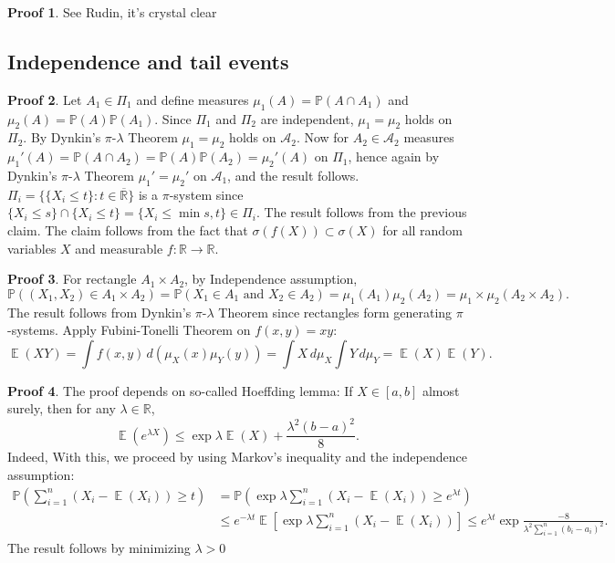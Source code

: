 \documentclass[hidelinks,11pt]{article}
\theoremstyle{definition}
\theoremstyle{dotless}
\newtheorem{prop}{Proof}[section]
\theoremstyle{remark}
\DeclareMathOperator{\E}{\mathbb{E}}
\DeclareMathOperator{\1}{\mathbf{1}}
\begin{document}
\begin{prop}
See Rudin, it's crystal clear
\end{prop}

\subsection{Independence and tail events}

\begin{prop}
Let $A_1\in\Pi_1$ and define measures $\mu_1(A)=\mathbb{P}(A\cap A_1)$ and $\mu_2(A)=\mathbb{P}(A)\mathbb{P}(A_1)$. Since $\Pi_1$ and $\Pi_2$ are independent, $\mu_1=\mu_2$ holds on $\Pi_2$. By Dynkin's $\pi$-$\lambda$ Theorem $\mu_1=\mu_2$ holds on $\mathcal{A}_2$. Now for $A_2\in\mathcal{A}_2$ measures $\mu_1'(A)=\mathbb{P}(A\cap A_2)=\mathbb{P}(A)\mathbb{P}(A_2)=\mu_2'(A)$ on $\Pi_1$, hence again by Dynkin's $\pi$-$\lambda$ Theorem $\mu_1'=\mu_2'$ on $\mathcal{A}_1$, and the result follows.\medbreak
$\Pi_i=\{\{X_i\leq t\}:t\in\overline{\mathbb{R}}\}$ is a $\pi$-system since $\{X_i\leq s\}\cap\{X_i\leq t\}=\{X_i\leq\min{s,t}\}\in\Pi_i$. The result follows from the previous claim.\medbreak
The claim follows from the fact that $\sigma(f(X))\subset\sigma(X)$ for all random variables $X$ and measurable $f:\mathbb{R}\to\mathbb{R}$.
\end{prop}

\begin{prop}
For rectangle $A_1\times A_2$, by Independence assumption,
\[\mathbb{P}((X_1,X_2)\in A_1\times A_2)=\mathbb{P}(X_1\in A_1\textrm{ and }X_2\in A_2)=\mu_1(A_1)\mu_2(A_2)=\mu_1\times\mu_2(A_2\times A_2).\]
The result follows from Dynkin's $\pi$-$\lambda$ Theorem since rectangles form generating $\pi$-systems.\medbreak
Apply Fubini-Tonelli Theorem on $f(x,y)=xy$:
\[\E(XY)=\int f(x,y)\,d(\mu_X(x)\mu_Y(y))=\int X\,d\mu_X\int Y\,d\mu_Y=\E(X)\E(Y).\]
\end{prop}

\begin{prop}
The proof depends on so-called Hoeffding lemma: If $X\in[a,b]$ almost surely, then for any $\lambda\in\mathbb{R}$,
\[\E(e^{\lambda X})\leq\exp{\lambda\E(X)+\frac{\lambda^2(b-a)^2}{8}}.\]
Indeed,\medbreak
With this, we proceed by using Markov's inequality and the independence assumption:
\begin{align*}
    \mathbb{P}\left(\sum_{i=1}^n(X_i-\E(X_i))\geq t\right)&=\mathbb{P}\left(\exp{\lambda\sum_{i=1}^n(X_i-\E(X_i))}\geq e^{\lambda t}\right)\\
    &\leq e^{-\lambda t}\E\left[\exp{\lambda\sum_{i=1}^n(X_i-\E(X_i))}\right]\leq e^{\lambda t}\exp{\frac{-8}{\lambda^2\sum_{i=1}^n(b_i-a_i)^2}}.
\end{align*}
The result follows by minimizing $\lambda>0$
\end{prop}
\end{document}
